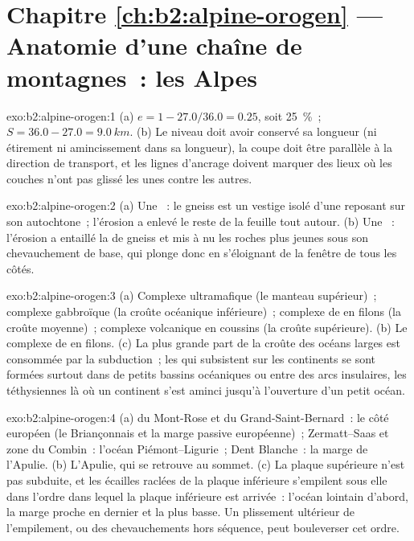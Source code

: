\section*{Chapitre \ref{ch:b2:alpine-orogen} --- Anatomie d'une chaîne de montagnes~: les Alpes}

\begin{solution}{exo:b2:alpine-orogen:1}
(a) $e = 1 - 27.0/36.0 = 0.25$, soit \qty{25}{\percent}~; $S = 36.0 - 27.0 =
\qty{9.0}{km}$. (b) Le niveau doit avoir conservé sa longueur (ni étirement ni amincissement dans sa longueur),
la coupe doit être parallèle à la direction de transport, et les lignes d'ancrage doivent marquer des lieux
où les couches n'ont pas glissé les unes contre les autres.
\end{solution}

\begin{solution}{exo:b2:alpine-orogen:2}
(a) Une ~: le gneiss est un vestige isolé d'une  reposant sur son autochtone~;
l'érosion a enlevé le reste de la feuille tout autour. (b) Une ~: l'érosion a
entaillé la  de gneiss et mis à nu les roches plus jeunes sous son chevauchement de base, qui
plonge donc en s'éloignant de la fenêtre de tous les côtés.
\end{solution}

\begin{solution}{exo:b2:alpine-orogen:3}
(a) Complexe ultramafique (le manteau supérieur)~; complexe gabbroïque (la croûte océanique inférieure)~;
complexe de  en filons (la croûte moyenne)~; complexe volcanique en coussins (la croûte supérieure).
(b) Le complexe de  en filons. (c) La plus grande part de la croûte des océans larges est consommée par la subduction~;
les  qui subsistent sur les continents se sont formées surtout dans de petits bassins océaniques ou entre des
arcs insulaires, les  téthysiennes là où un continent s'est aminci jusqu'à l'ouverture d'un petit océan.
\end{solution}

\begin{solution}{exo:b2:alpine-orogen:4}
(a)  du Mont-Rose et du Grand-Saint-Bernard~: le côté européen (le Briançonnais et la
marge passive européenne)~; Zermatt--Saas et zone du Combin~: l'océan Piémont--Ligurie~; Dent
Blanche~: la marge de l'Apulie. (b) L'Apulie, qui se retrouve au sommet. (c) La plaque supérieure n'est pas
subduite, et les écailles raclées de la plaque inférieure s'empilent sous elle dans l'ordre dans lequel la
plaque inférieure est arrivée~: l'océan lointain d'abord, la marge proche en dernier et la plus basse. Un plissement ultérieur de l'empilement,
ou des chevauchements hors séquence, peut bouleverser cet ordre.
\end{solution}


